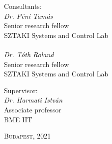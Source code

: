 


\begin{minipage}[t]{0.52\linewidth}
Consultants:\\
\forceindent \textit{Dr. Péni Tamás}\\
\forceindent Senior research fellow\\
\forceindent SZTAKI Systems and Control Lab\\
\phantom{o}\\
\forceindent \textit{Dr. Tóth Roland}\\
\forceindent Senior research fellow\\
\forceindent SZTAKI Systems and Control Lab
\end{minipage}\begin{minipage}[t]{0.48\linewidth}
Supervisor:\\
\forceindent \textit{Dr. Harmati István}\\
\forceindent Associate professor\\
\forceindent BME IIT
\end{minipage} 


		
\begin{center}
{\large\textsc{Budapest, }2021 }
\end{center}
